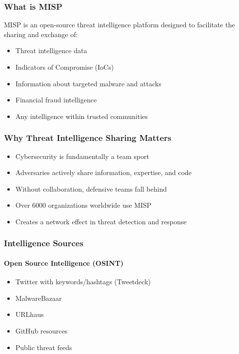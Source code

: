 \subsubsection{What is MISP}
MISP is an open-source threat intelligence platform designed to facilitate the sharing and exchange of:
\begin{itemize}
    \item Threat intelligence data
    \item Indicators of Compromise (IoCs)
    \item Information about targeted malware and attacks
    \item Financial fraud intelligence
    \item Any intelligence within trusted communities
\end{itemize}

\subsubsection{Why Threat Intelligence Sharing Matters}
\begin{itemize}
    \item Cybersecurity is fundamentally a team sport
    \item Adversaries actively share information, expertise, and code
    \item Without collaboration, defensive teams fall behind
    \item Over 6000 organizations worldwide use MISP
    \item Creates a network effect in threat detection and response
\end{itemize}

\subsubsection{Intelligence Sources}
\paragraph{Open Source Intelligence (OSINT)}
\begin{itemize}
    \item Twitter with keywords/hashtags (Tweetdeck)
    \item MalwareBazaar
    \item URLhaus
    \item GitHub resources
    \item Public threat feeds
\end{itemize}

